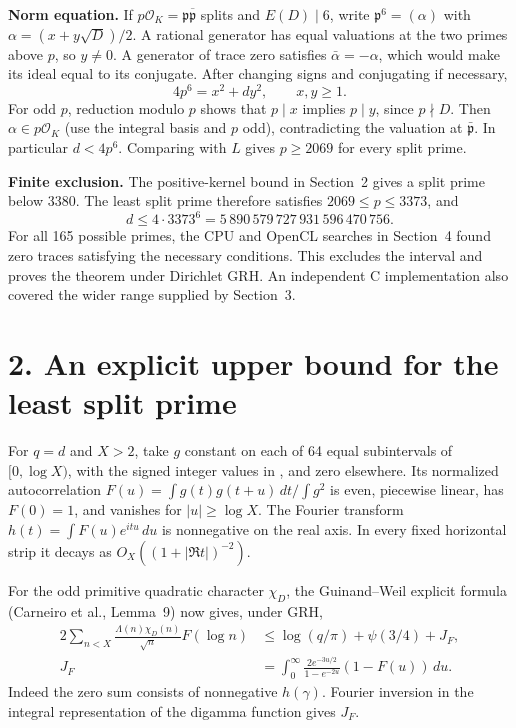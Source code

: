 \documentclass[11pt,letterpaper]{article}
\newcommand{\file}[1]{\texttt{\detokenize{#1}}}
\begin{document}
\textbf{Norm equation.}
If \(p\mathcal O_K=\mathfrak p\overline{\mathfrak p}\) splits and \(E(D)\mid6\),
write \(\mathfrak p^6=(\alpha)\) with
\(\alpha=(x+y\sqrt D)/2\). A rational generator has equal valuations at the
two primes above \(p\), so \(y\ne0\). A generator of trace zero satisfies
\(\bar\alpha=-\alpha\), which would make its ideal equal to its conjugate.
After changing signs and conjugating if necessary,
\[
                 4p^6=x^2+dy^2,\qquad x,y\ge1 .
\]
For odd \(p\), reduction modulo \(p\) shows that \(p\mid x\) implies \(p\mid y\),
since \(p\nmid D\). Then \(\alpha\in p\mathcal O_K\) (use the integral basis
and \(p\) odd), contradicting the valuation at \(\bar{\mathfrak p}\).
In particular \(d<4p^6\). Comparing with \(L\) gives \(p\ge2069\) for every split prime.

\textbf{Finite exclusion.} The positive-kernel bound in Section~2 gives a split prime
below 3380. The least split prime therefore satisfies \(2069\le p\le3373\), and
\[
 d\le4\cdot3373^6=5\,890\,579\,727\,931\,596\,470\,756 .
\]
For all 165 possible primes, the CPU and OpenCL searches in Section~4
found zero traces satisfying the necessary conditions. This excludes the
interval and proves the theorem under Dirichlet GRH. An independent C
implementation also covered the wider range supplied by Section~3.

\newpage
\section*{2. An explicit upper bound for the least split prime}
For \(q=d\) and \(X>2\), take \(g\) constant on each of 64 equal subintervals
of \([0,\log X)\), with the signed integer values in
\file{positive_kernel_verify.py}, and zero elsewhere. Its normalized
autocorrelation \(F(u)=\int g(t)g(t+u)\,dt/\int g^2\) is even, piecewise linear,
has \(F(0)=1\), and vanishes for \(|u|\ge\log X\). The Fourier transform
\(h(t)=\int F(u)e^{itu}\,du\) is nonnegative on the real axis. In every
fixed horizontal strip it decays as \(O_X((1+|\Re t|)^{-2})\).

For the odd primitive quadratic character \(\chi_D\), the Guinand--Weil
explicit formula (Carneiro et al., Lemma~9) now gives, under GRH,
\begin{align*}
2\sum_{n<X}\frac{\Lambda(n)\chi_D(n)}{\sqrt n}F(\log n)
 &\le \log(q/\pi)+\psi(3/4)+J_F,\\
J_F&=\int_0^\infty\frac{2e^{-3u/2}}{1-e^{-2u}}(1-F(u))\,du .
\end{align*}
Indeed the zero sum consists of nonnegative \(h(\gamma)\). Fourier inversion
in the integral representation of the digamma function gives \(J_F\).
\end{document}
